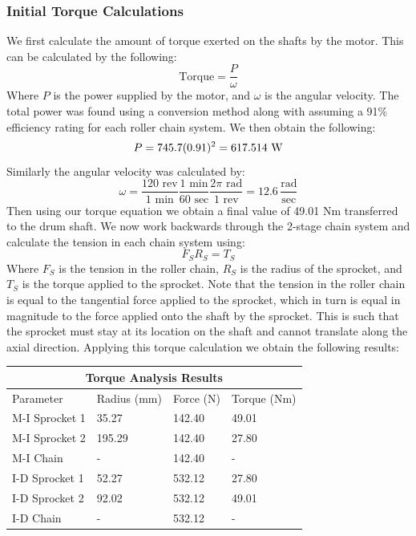 \documentclass[letterpaper,12pt]{article}
\begin{document}
\subsubsection{Initial Torque Calculations}
We first calculate the amount of torque exerted on the shafts by the motor. This can be calculated by the following:
\begin{equation*}
    \text{Torque} = \dfrac{P}{\omega}
\end{equation*}
Where $P$ is the power supplied by the motor, and $\omega$ is the angular velocity. The total power was found using a conversion method along with assuming a 91\% efficiency rating for each roller chain system. We then obtain the following:
\begin{equation*}
    P = 745.7(0.91)^2 = 617.514 \text{ W} \\
\end{equation*}
Similarly the angular velocity was calculated by:
\begin{equation*}
    \omega = \dfrac{120 \text{ rev}}{1 \text{ min}}\dfrac{1 \text{ min}}{60 \text{ sec}}\dfrac{2\pi \text{ rad}}{1 \text{ rev}} = 12.6\, \dfrac{\text{rad}}{\text{sec}}
\end{equation*}
Then using our torque equation we obtain a final value of 49.01 Nm transferred to the drum shaft. We now work backwards through the 2-stage chain system and calculate the tension in each chain system using:
\begin{equation*}
    F_SR_S = T_S
\end{equation*}
Where $F_S$ is the tension in the roller chain, $R_S$ is the radius of the sprocket, and $T_S$ is the torque applied to the sprocket. Note that the tension in the roller chain is equal to the tangential force applied to the sprocket, which in turn is equal in magnitude to the force applied onto the shaft by the sprocket. This is such that the sprocket must stay at its location on the shaft and cannot translate along the axial direction. Applying this torque calculation we obtain the following results:
\begin{center}
	\begin{tabular}{ |p{3cm}||p{2.5cm}|p{2.5cm}|p{2.5cm}|  }
		\hline
		\multicolumn{4}{|c|}{Torque Analysis Results} \\
		\hline
		Parameter & Radius (mm) & Force (N) & Torque (Nm)\\
		\hline
		M-I Sprocket 1 & 35.27 & 142.40 & 49.01 \\
		M-I Sprocket 2 & 195.29 & 142.40 & 27.80 \\
		M-I Chain & - & 142.40 & - \\
		I-D Sprocket 1 & 52.27 & 532.12 & 27.80 \\
		I-D Sprocket 2 & 92.02 & 532.12 & 49.01 \\
		I-D Chain & - & 532.12 & - \\
		\hline
	\end{tabular}
\end{center}
\end{document}
